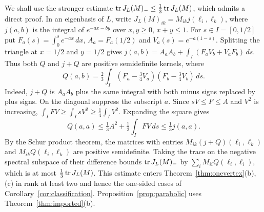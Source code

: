 We shall use the stronger estimate
$\operatorname{tr} J_L(M)_-\leq\frac13\operatorname{tr} J_L(M)$, which admits a direct proof.
In an eigenbasis of $L$, write $J_L(M)_{ik}=M_{ik}j(\ell_i,\ell_k)$,
where $j(a,b)$ is the integral of $e^{-ax-by}$ over $x,y\geq0$, $x+y\leq1$.
For $s\in I=[0,1/2]$ put $F_a(s)=\int_0^s e^{-ax}\,dx$,
$A_a=F_a(1/2)$ and $V_a(s)=e^{-a(1-s)}$. Splitting the triangle at
$x=1/2$ and $y=1/2$ gives
$j(a,b)=A_aA_b+\int_I(F_aV_b+V_aF_b)\,ds$. Thus both $Q$ and $j+Q$ are
positive semidefinite kernels, where
\[
 Q(a,b)=\tfrac23\int_I(F_a-\tfrac34V_a)(F_b-\tfrac34V_b)\,ds .
\]
Indeed, $j+Q$ is $A_aA_b$ plus the same integral with both minus signs
replaced by plus signs. On the diagonal suppress the subscript $a$. Since
$sV\leq F\leq A$ and $V^2$ is increasing,
$\int_I FV\geq\int_I sV^2\geq\tfrac14\int_I V^2$. Expanding the square gives
\[
 Q(a,a)\leq\tfrac13 A^2+\tfrac12\int_I FV\,ds
 \leq\tfrac13 j(a,a).
\]
By the Schur product theorem, the matrices with entries
$M_{ik}(j+Q)(\ell_i,\ell_k)$ and $M_{ik}Q(\ell_i,\ell_k)$ are positive
semidefinite. Taking the trace on the negative spectral subspace of their
difference bounds $\operatorname{tr} J_L(M)_-$ by $\sum_i M_{ii}Q(\ell_i,\ell_i)$,
which is at most $\frac13\operatorname{tr} J_L(M)$.
This estimate enters Theorem~\ref{thm:onevertex}(b),(c) in rank at least
two and hence the one-sided cases of Corollary~\ref{cor:classification}.
Proposition~\ref{prop:parabolic} uses Theorem~\ref{thm:imported}(b).
